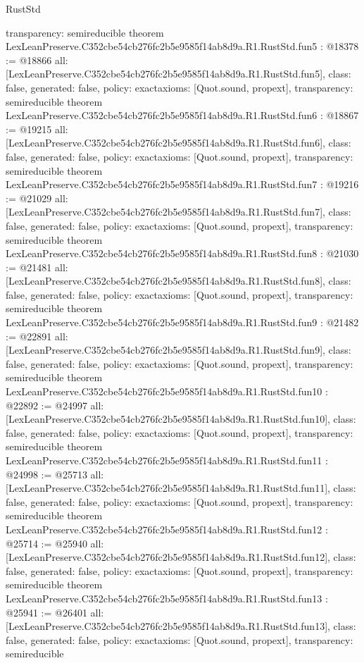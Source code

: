 \begin{lexlean}{RustStd}
\begin{coremodule}
{  transparency: semireducible
}
theorem LexLeanPreserve.C352cbe54cb276fc2b5e9585f14ab8d9a.R1.RustStd.fun5 : @18378 := @18866 {
  all: [LexLeanPreserve.C352cbe54cb276fc2b5e9585f14ab8d9a.R1.RustStd.fun5],
  class: false,
  generated: false,
  policy: exact{axioms: [Quot.sound, propext]},
  transparency: semireducible
}
theorem LexLeanPreserve.C352cbe54cb276fc2b5e9585f14ab8d9a.R1.RustStd.fun6 : @18867 := @19215 {
  all: [LexLeanPreserve.C352cbe54cb276fc2b5e9585f14ab8d9a.R1.RustStd.fun6],
  class: false,
  generated: false,
  policy: exact{axioms: [Quot.sound, propext]},
  transparency: semireducible
}
theorem LexLeanPreserve.C352cbe54cb276fc2b5e9585f14ab8d9a.R1.RustStd.fun7 : @19216 := @21029 {
  all: [LexLeanPreserve.C352cbe54cb276fc2b5e9585f14ab8d9a.R1.RustStd.fun7],
  class: false,
  generated: false,
  policy: exact{axioms: [Quot.sound, propext]},
  transparency: semireducible
}
theorem LexLeanPreserve.C352cbe54cb276fc2b5e9585f14ab8d9a.R1.RustStd.fun8 : @21030 := @21481 {
  all: [LexLeanPreserve.C352cbe54cb276fc2b5e9585f14ab8d9a.R1.RustStd.fun8],
  class: false,
  generated: false,
  policy: exact{axioms: [Quot.sound, propext]},
  transparency: semireducible
}
theorem LexLeanPreserve.C352cbe54cb276fc2b5e9585f14ab8d9a.R1.RustStd.fun9 : @21482 := @22891 {
  all: [LexLeanPreserve.C352cbe54cb276fc2b5e9585f14ab8d9a.R1.RustStd.fun9],
  class: false,
  generated: false,
  policy: exact{axioms: [Quot.sound, propext]},
  transparency: semireducible
}
theorem LexLeanPreserve.C352cbe54cb276fc2b5e9585f14ab8d9a.R1.RustStd.fun10 : @22892 := @24997 {
  all: [LexLeanPreserve.C352cbe54cb276fc2b5e9585f14ab8d9a.R1.RustStd.fun10],
  class: false,
  generated: false,
  policy: exact{axioms: [Quot.sound, propext]},
  transparency: semireducible
}
theorem LexLeanPreserve.C352cbe54cb276fc2b5e9585f14ab8d9a.R1.RustStd.fun11 : @24998 := @25713 {
  all: [LexLeanPreserve.C352cbe54cb276fc2b5e9585f14ab8d9a.R1.RustStd.fun11],
  class: false,
  generated: false,
  policy: exact{axioms: [Quot.sound, propext]},
  transparency: semireducible
}
theorem LexLeanPreserve.C352cbe54cb276fc2b5e9585f14ab8d9a.R1.RustStd.fun12 : @25714 := @25940 {
  all: [LexLeanPreserve.C352cbe54cb276fc2b5e9585f14ab8d9a.R1.RustStd.fun12],
  class: false,
  generated: false,
  policy: exact{axioms: [Quot.sound, propext]},
  transparency: semireducible
}
theorem LexLeanPreserve.C352cbe54cb276fc2b5e9585f14ab8d9a.R1.RustStd.fun13 : @25941 := @26401 {
  all: [LexLeanPreserve.C352cbe54cb276fc2b5e9585f14ab8d9a.R1.RustStd.fun13],
  class: false,
  generated: false,
  policy: exact{axioms: [Quot.sound, propext]},
  transparency: semireducible
}
\end{coremodule}
\end{lexlean}
